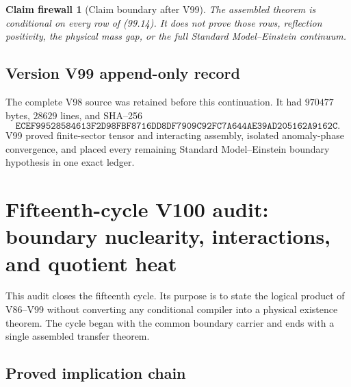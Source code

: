\documentclass[11pt]{article}
\newtheorem{firewall}[theorem]{Claim firewall}
\theoremstyle{remark}
\begin{document}
\begin{firewall}[Claim boundary after V99]
\label{fire:v15v99}
The assembled theorem is conditional on every row of (99.14).  It
does not prove those rows, reflection positivity, the physical mass
gap, or the full Standard Model--Einstein continuum.
\end{firewall}

\section*{Version V99 append-only record}
The complete V98 source was retained before this continuation.  It
had \(970477\) bytes, \(28629\) lines, and SHA--256
\[
 \texttt{ECEF99528584613F2D98FBF8716DD8DF7909C92FC7A644AE39AD205162A9162C}.
\]
V99 proved finite-sector tensor and interacting assembly, isolated
anomaly-phase convergence, and placed every remaining
Standard Model--Einstein boundary hypothesis in one exact ledger.
\chapter{Fifteenth-cycle V100 audit: boundary nuclearity, interactions, and quotient heat}
\label{sec:v15v100}

This audit closes the fifteenth cycle.  Its purpose is to state the
logical product of V86--V99 without converting any conditional
compiler into a physical existence theorem.  The cycle began with
the common boundary carrier and ends with a single assembled
transfer theorem.

\section{Proved implication chain}
\end{document}
